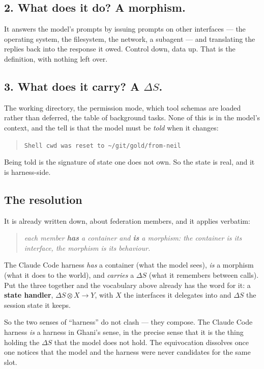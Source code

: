 \documentclass[11pt,a4paper]{article}
\newcommand{\code}[1]{\texttt{\small #1}}
\begin{document}
\subsection*{2. What does it do? A morphism.}

It answers the model's prompts by issuing prompts on other interfaces --- the operating system, the
filesystem, the network, a subagent --- and translating the replies back into the response it owed.
Control down, data up. That is the definition, with nothing left over.

\subsection*{3. What does it carry? A $\Delta S$.}

The working directory, the permission mode, which tool schemas are loaded rather than deferred, the
table of background tasks. None of this is in the model's context, and the tell is that the model
must be \emph{told} when it changes:
\begin{quote}
\code{Shell cwd was reset to \textasciitilde/git/gold/from-neil}
\end{quote}
Being told is the signature of state one does not own. So the state is real, and it is
harness-side.

\subsection*{The resolution}

It is already written down, about federation members, and it applies verbatim:
\begin{quote}\itshape
each member \textbf{has} a container and \textbf{is} a morphism: the container is its interface,
the morphism is its behaviour.
\end{quote}
The Claude Code harness \emph{has} a container (what the model sees), \emph{is} a morphism (what it
does to the world), and \emph{carries} a $\Delta S$ (what it remembers between calls). Put the
three together and the vocabulary above already has the word for it: a \textbf{state handler},
$\Delta S \otimes X \to Y$, with $X$ the interfaces it delegates into and $\Delta S$ the session
state it keeps.

So the two senses of ``harness'' do not clash --- they compose. The Claude Code harness \emph{is} a
harness in Ghani's sense, in the precise sense that it is the thing holding the $\Delta S$ that the
model does not hold. The equivocation dissolves once one notices that the model and the harness
were never candidates for the same slot.
\end{document}

